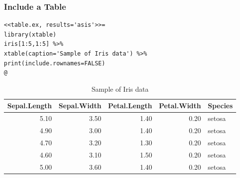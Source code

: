 \documentclass[10pt]{beamer}\usepackage[]{graphicx}\usepackage[]{color}
\makeatletter
\newenvironment{kframe}{%
 \def\at@end@of@kframe{}%
 \ifinner\ifhmode%
  \def\at@end@of@kframe{\end{minipage}}%
  \begin{minipage}{\columnwidth}%
 \fi\fi%
 \def\FrameCommand##1{\hskip\@totalleftmargin \hskip-\fboxsep
 \colorbox{shadecolor}{##1}\hskip-\fboxsep
     \hskip-\linewidth \hskip-\@totalleftmargin \hskip\columnwidth}%
 \MakeFramed {\advance\hsize-\width
   \@totalleftmargin\z@ \linewidth\hsize
   \@setminipage}}%
 {\par\unskip\endMakeFramed%
 \at@end@of@kframe}
\newenvironment{knitrout}{}{} %
\makeatother
\begin{document}
\begin{frame}[fragile]
\frametitle{Include a Table}
\scriptsize
\begin{knitrout}
\color{fgcolor}\begin{kframe}
\begin{verbatim}
<<table.ex, results='asis'>>=
library(xtable)
iris[1:5,1:5] %>% 
xtable(caption='Sample of Iris data') %>%
print(include.rownames=FALSE)
@
\end{verbatim}
\end{kframe}
\end{knitrout}
\begin{table}[ht]
\centering
\begin{tabular}{rrrrl}
  \hline
Sepal.Length & Sepal.Width & Petal.Length & Petal.Width & Species \\ 
  \hline
5.10 & 3.50 & 1.40 & 0.20 & setosa \\ 
  4.90 & 3.00 & 1.40 & 0.20 & setosa \\ 
  4.70 & 3.20 & 1.30 & 0.20 & setosa \\ 
  4.60 & 3.10 & 1.50 & 0.20 & setosa \\ 
  5.00 & 3.60 & 1.40 & 0.20 & setosa \\ 
   \hline
\end{tabular}
\caption{Sample of Iris data} 
\end{table}

\end{frame}
\end{document}
